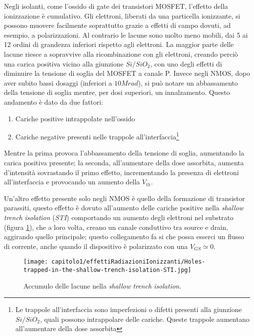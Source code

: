 Negli isolanti, come l'ossido di gate dei transistori MOSFET, l'effetto della ionizzazione è cumulativo. Gli elettroni, liberati da una particella ionizzante, si possono muovere facilmente soprattutto grazie a effetti di campo dovuti, ad esempio, a polarizzazioni.
Al contrario le lacune sono molto meno mobili, dai 5 ai 12 ordini di grandezza inferiori rispetto agli elettroni. La maggior parte delle lacune riesce a sopravvive alla ricombinazione con gli elettroni, creando perciò una carica positiva vicino alla giunzione $Si/SiO_2$, con uno degli effetti di diminuire la tensione di soglia del MOSFET a canale P. Invece negli NMOS, dopo aver subito bassi dosaggi (inferiori a $10Mrad$), si può notare un abbassamento della tensione di soglia mentre, per dosi superiori, un innalzamento. Questo andamento è dato da due fattori:
\begin{enumerate}
	\item Cariche positive intrappolate nell'ossido
	\item Cariche negative presenti nelle trappole all'interfaccia\footnote{Le trappole all'interfaccia sono imperfezioni o difetti presenti alla giunzione $Si/SiO_2$, quali possono intrappolare delle cariche. Queste trappole aumentano all'aumentare della dose assorbita}
\end{enumerate}
Mentre la prima provoca l'abbassamento della tensione di soglia, aumentando la carica positiva presente; la seconda, all'aumentare della dose assorbita, aumenta d'intensità sovrastando il primo effetto, incrementando la presenza di elettroni all'interfaccia e provocando un aumento della $V_{th}$.  

\vspace{0.5cm}

Un'altro effetto presente solo negli NMOS è quello della formazione di transistor parassiti\cite{effetti_radiazioni:CMOS_IC_radiation_hardening_by_design}, questo effetto è dovuto all'aumento delle cariche positive nella \textit{shallow trench isolation} (\textit{STI}) comportando un aumento degli elettroni nel substrato (figura \ref{fig:accumulo_lacune_STI}), che a loro volta, creano un canale conduttivo tra source e drain, aggirando quello principale; questo collegamento fa si che possa esserci un flusso di corrente, anche quando il dispositivo è polarizzato con una $V_{GS} \simeq 0$.

\begin{figure}[ht]
	\centering

	\texttt{[image: capitolo1/effettiRadiazioniIonizzanti/Holes-trapped-in-the-shallow-trench-isolation-STI.jpg]}

	\caption[Lacune nella \textit{STI}]{Accumulo delle lacune nella \textit{shallow trench isolation}\cite{effetti_radiazioni:CMOS_IC_radiation_hardening_by_design}.}
	\label{fig:accumulo_lacune_STI}

\end{figure}


